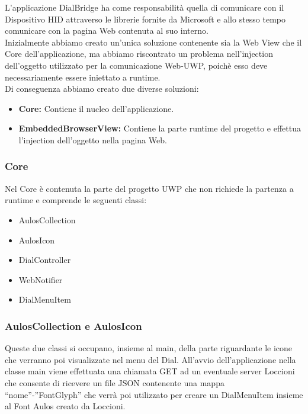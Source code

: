 L’applicazione DialBridge ha come responsabilità quella di comunicare con il Dispositivo HID attraverso le librerie fornite da Microsoft e allo stesso tempo comunicare con la pagina Web contenuta al suo interno.\\

Inizialmente abbiamo creato un’unica soluzione contenente sia la Web View che il Core dell’applicazione, ma abbiamo riscontrato un problema nell’injection dell’oggetto utilizzato per la comunicazione Web-UWP, poichè esso deve necessariamente essere iniettato a runtime.\\

Di conseguenza abbiamo creato due diverse soluzioni:

\begin{itemize}
\item \textbf{Core:} Contiene il nucleo dell’applicazione.
\item \textbf{EmbeddedBrowserView:} Contiene la parte runtime del progetto e effettua l’injection dell’oggetto nella pagina Web.
\end{itemize}

\subsubsection{Core}

Nel Core è contenuta la parte del progetto UWP che non richiede la partenza a runtime e comprende le seguenti classi:

\begin{itemize}
\item AulosCollection
\item AulosIcon
\item DialController
\item WebNotifier
\item DialMenuItem
\end{itemize}

\subsubsection{AulosCollection e AulosIcon}

Queste due classi si occupano, insieme al main, della parte riguardante le icone che verranno poi visualizzate nel menu del Dial. All’avvio dell’applicazione nella classe main viene effettuata una chiamata GET ad un eventuale server Loccioni che consente di ricevere un file JSON contenente una mappa “nome”-”FontGlyph” che verrà poi utilizzato per creare un DialMenuItem insieme al Font Aulos creato da Loccioni.\\

